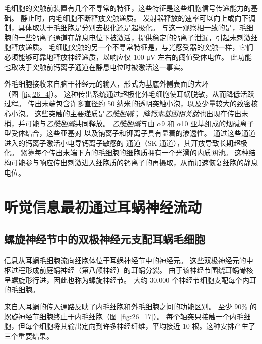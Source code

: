 毛细胞的突触前装置有几个不寻常的特征，这些特征是这些细胞信号传递能力的基础。
静止时，内毛细胞不断释放突触递质。
发射器释放的速率可以向上或向下调制，具体取决于毛细胞是分别去极化还是超极化。
与这一观察相一致的是，毛细胞的一些钙离子通道在静息电位下被激活，提供稳定的钙离子泄漏，引起未刺激细胞释放递质。
毛细胞突触的另一个不寻常特征是，与光感受器的突触一样，它们必须能够可靠地释放神经递质，以响应仅 100 μV 左右的阈值受体电位。
此功能也取决于突触前钙离子通道在静息电位时被激活这一事实。


外毛细胞接收来自脑干神经元的输入，形式为基底外侧表面的大环（图~\ref{fig:26_4}）。
这种传出系统通过超极化外毛细胞使耳蜗脱敏，从而降低活跃过程。
传出末端包含许多直径约 50 纳米的透明突触小泡，以及少量较大的致密核心小泡。
这些突触的主要递质是\textit{乙酰胆碱}；
\textit{降钙素基因相关肽}也出现在传出末梢，并可能与\textit{乙酰胆碱}共同释放。
\textit{乙酰胆碱}与由 $\alpha$9 和 $\alpha$10 亚基组成的烟碱离子型受体结合，这些亚基对  以及钠离子和钾离子具有显着的渗透性。
通过这些通道进入的钙离子激活小电导钙离子敏感的  通道（SK 通道），其开放导致长期超极化。
紧靠每个传出末端下方的毛细胞的细胞质拥有一个光滑的内质网池。
这种结构可能参与响应传出刺激进入细胞质的钙离子的再摄取，从而加速恢复细胞的静息电位。



\section{听觉信息最初通过耳蜗神经流动}

\subsection{螺旋神经节中的双极神经元支配耳蜗毛细胞}

信息从耳蜗毛细胞流向细胞体位于耳蜗神经节中的神经元。
这些双极神经元的中枢过程形成前庭蜗神经（第八颅神经）的耳蜗分裂。
由于该神经节围绕耳蜗骨核呈螺旋形行进，因此也称为螺旋神经节。
大约 30,000 个神经节细胞支配每个内耳的毛细胞。


来自人耳蜗的传入通路反映了内毛细胞和外毛细胞之间的功能区别。
至少 90\% 的螺旋神经节细胞终止于内毛细胞（图~\ref{fig:26_17}）。
每个轴突只接触一个内毛细胞，但每个细胞将其输出定向到许多神经纤维，平均接近 10 根。这种安排产生了三个重要结果。


